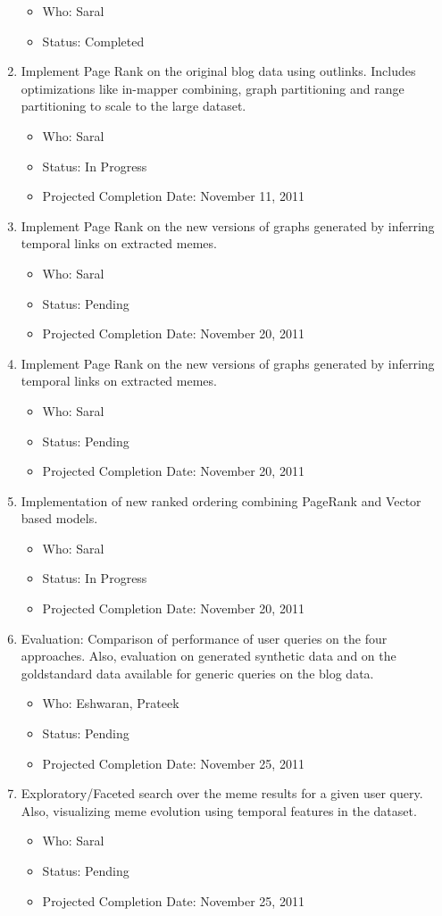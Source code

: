\documentclass{acm_proc_article-sp}
\begin{document}
\begin{enumerate}
\begin{itemize}
	\item Who: Saral
	\item Status: Completed
	\end{itemize}
  \item Implement Page Rank on the original blog data using outlinks. Includes optimizations like in-mapper combining, graph partitioning and range partitioning to scale to the large dataset. \begin{itemize}
	\item Who: Saral
	\item Status: In Progress
	\item Projected Completion Date: November 11, 2011
	\end{itemize}	
  \item Implement Page Rank on the new versions of graphs generated by inferring temporal links on extracted memes. \begin{itemize}
	\item Who: Saral
	\item Status: Pending
	\item Projected Completion Date: November 20, 2011
	\end{itemize}
  \item Implement Page Rank on the new versions of graphs generated by inferring temporal links on extracted memes. \begin{itemize}
	\item Who: Saral
	\item Status: Pending
	\item Projected Completion Date: November 20, 2011
	\end{itemize}
  \item Implementation of new ranked ordering combining PageRank and Vector based models. \begin{itemize}
	\item Who: Saral
	\item Status: In Progress
	\item Projected Completion Date: November 20, 2011
	\end{itemize}
  \item Evaluation: Comparison of performance of user queries on the four approaches. Also, evaluation on generated synthetic data and on the goldstandard data available for generic queries on the blog data. \begin{itemize}
	\item Who: Eshwaran, Prateek
	\item Status: Pending
	\item Projected Completion Date: November 25, 2011
	\end{itemize}
  \item Exploratory/Faceted search over the meme results for a given user query. Also, visualizing meme evolution using temporal features in the dataset. \begin{itemize}
	\item Who: Saral
	\item Status: Pending
	\item Projected Completion Date: November 25, 2011
	\end{itemize}
\end{enumerate}
\end{document}
